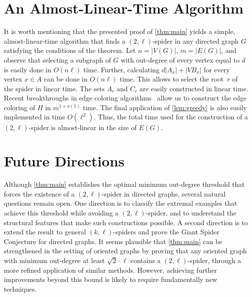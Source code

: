 \documentclass[a4paper,USenglish,cleveref,autoref,thm-restate,pdfa]{lipics-v2021}
\newcommand{\norm}[1]{{\left|#1\right|}}
\newcommand{\brac}[1]{\left(#1\right)}
\newcommand{\Oh}[1]{O\brac{#1}}
\newcommand{\oh}[1]{o\brac{#1}}
\begin{document}
\section{An Almost-Linear-Time Algorithm}

It is worth mentioning that the presented proof of \cref{thm:main} yields a simple, almost-linear-time algorithm that finds a $(2,\ell)$\nobreakdash-spider in any directed graph $G$ satisfying the conditions of the theorem.
Let $n=\norm{V(G)}$, $m=\norm{E(G)}$, and observe that selecting a subgraph of $G$ with out-degree of every vertex equal to $d$ is easily done in $\Oh{n\ell}$ time.
Further, calculating $d\norm{A_x}+\norm{VB_x}$ for every vertex $x \in A$ can be done in $\Oh{n\ell}$ time.
This allows to select the root~$r$ of the spider in linear time.
The sets $A_r$ and $C_r$ are easily constructed in linear time.
Recent breakthroughs in edge coloring algorithms~\cite{assadi2025,assadi2026} allow us to construct the edge coloring of $H$ in $m^{1+\oh{1}}$ time.
The final application of \cref{lem:greedy} is also easily implemented in time $\Oh{\ell^2}$.
Thus, the total time used for the construction of a $(2,\ell)$\nobreakdash-spider is almost-linear in the size of $E(G)$.

\section{Future Directions}

Although \cref{thm:main} establishes the optimal minimum out-degree threshold that forces the existence of a $(2,\ell)$-spider in directed graphs, several natural questions remain open. One direction is to classify the extremal examples that achieve this threshold while avoiding a $(2,\ell)$-spider, and to understand the structural features that make such constructions possible. A second direction is to extend the result to general $(k,\ell)$-spiders and prove the Giant Spider Conjecture for directed graphs. 
It seems plausible that \cref{thm:main} can be strengthened in the setting of oriented graphs by proving that any oriented graph with minimum out-degree at least $\sqrt{2}\cdot\ell$ contains a $(2,\ell)$-spider, through a more refined application of similar methods.
However, achieving further improvements beyond this bound is likely to require fundamentally new techniques.


\end{document}
